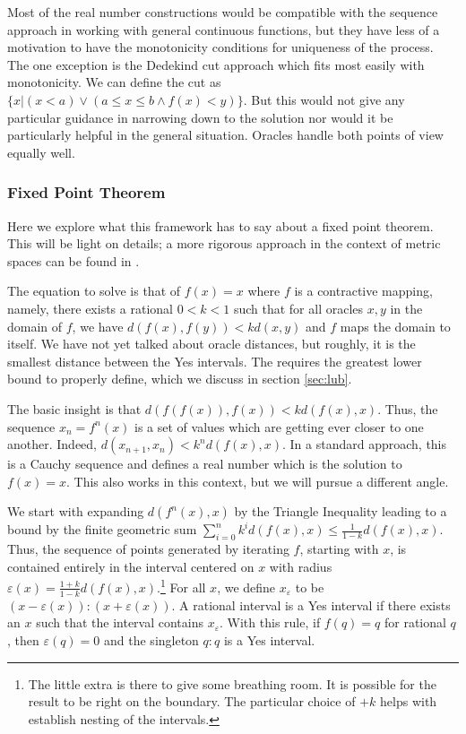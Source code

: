 \documentclass[12pt]{article}
\begin{document}
Most of the real number constructions would be compatible with the sequence approach in working with general continuous functions, but they have less of a motivation to have the monotonicity conditions for uniqueness of the process. The one exception is the Dedekind cut approach which fits most easily with monotonicity. We can define the cut as $\{x| (x<a) \vee (a \leq x \leq b \wedge f(x) < y) \}$. But this would not give any particular guidance in narrowing down to the solution nor would it be particularly helpful in the general situation. Oracles handle both points of view equally well. 

\subsubsection{Fixed Point Theorem}

Here we explore what this framework has to say about a fixed point theorem. This will be light on details; a more rigorous approach in the context of metric spaces can be found in \cite{taylor23metric}.

The equation to solve is that of $f(x) = x$ where $f$ is a contractive mapping, namely, there exists a rational $0 < k < 1$ such that for all oracles $x,y$ in the domain of $f$, we have $d(f(x), f(y)) < k d(x,y)$ and $f$ maps the domain to itself. We have not yet talked about oracle distances, but roughly, it is the smallest distance between the Yes intervals. The requires the greatest lower bound to properly define, which we discuss in section \ref{sec:lub}. 

The basic insight is that $d(f(f(x)), f(x)) < k d(f(x), x)$. Thus, the sequence $x_n = f^n (x)$ is a set of values which are getting ever closer to one another. Indeed, $d(x_{n+1}, x_n) < k^n d(f(x), x)$. In a standard approach, this is a Cauchy sequence and defines a real number which is the solution to $f(x) = x$. This also works in this context, but we will pursue a different angle. 

We start with expanding $d(f^n(x), x)$ by the Triangle Inequality leading to a bound by the finite geometric sum $\sum^n_{i=0} k^i d(f(x), x) \leq \frac{1}{1-k} d(f(x),x)$. Thus, the sequence of points generated by iterating $f$, starting with $x$, is contained entirely in the interval centered on $x$ with radius $\varepsilon(x) = \frac{1+k}{1-k} d(f(x),x)$.\footnote{The little extra is there to give some breathing room. It is possible for the result to be right on the boundary. The particular choice of $+k$ helps with establish nesting of the intervals. } For all $x$, we define $x_\varepsilon$ to be $(x-\varepsilon(x)):(x+\varepsilon(x))$. A rational interval is a Yes interval if there exists an $x$ such that the interval contains $x_\varepsilon$. With this rule, if $f(q) = q$ for rational $q$, then $\varepsilon(q) = 0$ and the singleton $q:q$ is a Yes interval. 
\end{document}
